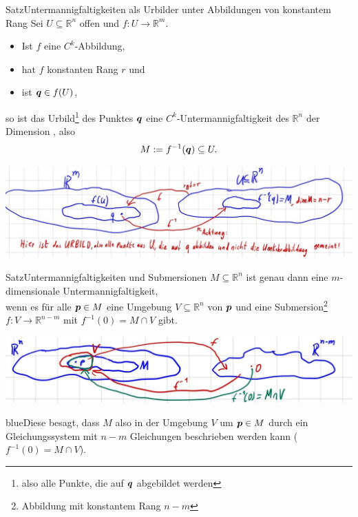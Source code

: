 \begin{Satz}
{Satz}{Untermannigfaltigkeiten als Urbilder unter Abbildungen von konstantem Rang}
Sei $U\subseteq\mathbb{R}^n$ offen und $f:U\to\mathbb{R}^m$.
\begin{itemize}
    \item Ist $f$ eine $C^k$-Abbildung,
    \item hat $f$ konstanten Rang $r$ und
    \item ist ${{\text{\boldmath${q}$}}}\in f(U)$,
\end{itemize}
so ist das Urbild\footnote{also alle Punkte, die auf ${{\text{\boldmath${q}$}}}$ abgebildet werden} des Punktes ${{\text{\boldmath${q}$}}}$ eine $C^k$-Untermannigfaltigkeit des $\mathbb{R}^n$ der Dimension , also
\begin{equation}
    M:=f^{-1}({{\text{\boldmath${q}$}}})\subseteq U.
\end{equation}
\begin{center}
    \includegraphics[width=.5\textwidth]{Dateien/10/10UMF1.jpg}
\end{center}
\end{Satz}
\begin{Satz}
{Satz}{Untermannigfaltigkeiten und Submersionen}
$M\subseteq \mathbb{R}^n$ ist genau dann eine $m$-dimensionale Untermannigfaltigkeit, \\
wenn es für alle ${{\text{\boldmath${p}$}}}\in M$ eine Umgebung $V\subseteq \mathbb{R}^n$ von ${{\text{\boldmath${p}$}}}$ und eine Submersion\footnote{Abbildung mit konstantem Rang $n-m$} $f:V\to\mathbb{R}^{n-m}$ mit $f^{-1}(0)=M\cap V$ gibt.
\begin{center}
    \includegraphics[width=.5\textwidth]{Dateien/10/10UMF2.jpg}
\end{center}
\end{Satz}
blue{Diese besagt, dass $M$ also in der Umgebung $V$ um ${{\text{\boldmath${p}$}}}\in M$ durch ein Gleichungssystem mit $n-m$ Gleichungen beschrieben werden kann ($f^{-1}(0)=M\cap V$).} \\

